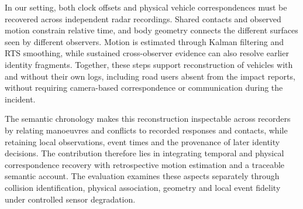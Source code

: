 In our setting, both clock offsets and physical vehicle correspondences
must be recovered across independent radar recordings. Shared contacts
and observed motion constrain relative time, and body geometry connects
the different surfaces seen by different observers. Motion is estimated
through Kalman filtering and RTS smoothing, while sustained
cross-observer evidence can also resolve earlier identity fragments.
Together, these steps support reconstruction of vehicles with and
without their own logs, including road users absent from the impact
reports, without requiring camera-based correspondence or communication
during the incident.

The semantic chronology makes this reconstruction inspectable across
recorders by relating manoeuvres and conflicts to recorded responses
and contacts, while retaining local observations, event times and the
provenance of later identity decisions. The contribution therefore lies
in integrating temporal and physical correspondence recovery with
retrospective motion estimation and a traceable semantic account.
The evaluation examines these aspects separately through collision
identification, physical association, geometry and local event fidelity
under controlled sensor degradation.
